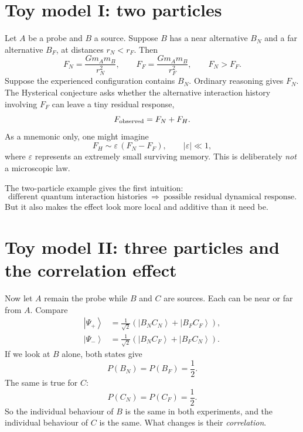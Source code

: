 \documentclass[11pt]{article}
\newcommand{\ket}[1]{\left|#1\right\rangle}
\begin{document}
\section{Toy model I: two particles}
Let $A$ be a probe and $B$ a source. Suppose $B$ has a near alternative $B_N$ and a far alternative $B_F$, at distances $r_N<r_F$. Then
\begin{equation}
F_N=\frac{Gm_Am_B}{r_N^2},\qquad F_F=\frac{Gm_Am_B}{r_F^2},\qquad F_N>F_F.
\end{equation}
Suppose the experienced configuration contains $B_N$. Ordinary reasoning gives $F_N$. The Hysterical conjecture asks whether the alternative interaction history involving $F_F$ can leave a tiny residual response,
\begin{equation}
F_{\rm observed}=F_N+F_H.
\end{equation}
As a mnemonic only, one might imagine
\begin{equation}
F_H\sim\varepsilon\,(F_N-F_F),\qquad |\varepsilon|\ll1,
\end{equation}
where $\varepsilon$ represents an extremely small surviving memory. This is deliberately \emph{not} a microscopic law.

The two-particle example gives the first intuition:
\begin{equation}
\boxed{\text{different quantum interaction histories}\ \Longrightarrow\ \text{possible residual dynamical response}.}
\end{equation}
But it also makes the effect look more local and additive than it need be.

\section{Toy model II: three particles and the correlation effect}
Now let $A$ remain the probe while $B$ and $C$ are sources. Each can be near or far from $A$. Compare
\begin{align}
\ket{\Psi_+}&=\frac{1}{\sqrt2}\left(\ket{B_NC_N}+\ket{B_FC_F}\right),\\
\ket{\Psi_-}&=\frac{1}{\sqrt2}\left(\ket{B_NC_F}+\ket{B_FC_N}\right).
\end{align}
If we look at $B$ alone, both states give
\begin{equation}
P(B_N)=P(B_F)=\frac12.
\end{equation}
The same is true for $C$:
\begin{equation}
P(C_N)=P(C_F)=\frac12.
\end{equation}
So the individual behaviour of $B$ is the same in both experiments, and the individual behaviour of $C$ is the same. What changes is their \emph{correlation}.
\end{document}
